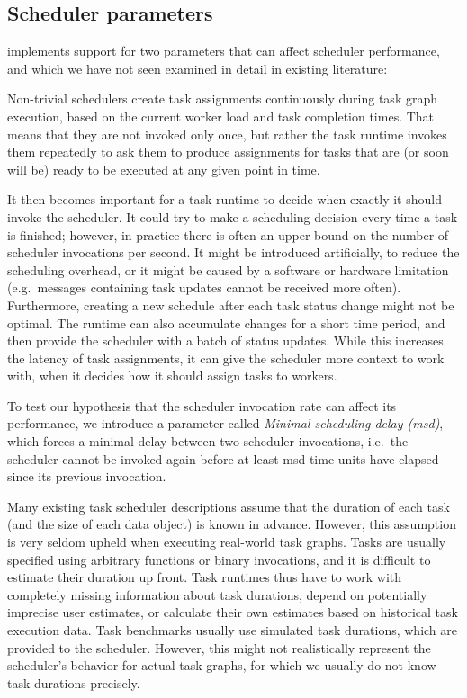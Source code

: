 \subsection{Scheduler parameters}
\estee{} implements support for two parameters that can affect scheduler
performance, and which we have not seen examined in detail in existing literature:
\begin{description}[wide=0pt]
	\item[Minimal scheduling delay] Non-trivial schedulers create task assignments continuously during task graph execution, based on
		the current worker load and task completion times. That means that they are not invoked only once,
		but rather the task runtime invokes them repeatedly to ask them to produce assignments for tasks
		that are (or soon will be) ready to be executed at any given point in time.

		It then becomes important for a task runtime to decide when exactly it should invoke the
		scheduler. It could try to make a scheduling decision every time a task is finished; however, in
		practice there is often an upper bound on the number of scheduler invocations per second. It might
		be introduced artificially, to reduce the scheduling overhead, or it might be caused by a software
		or hardware limitation (e.g.\ messages containing task updates cannot be received more often).
		Furthermore, creating a new schedule after each task status change might not be optimal. The
		runtime can also accumulate changes for a short time period, and then provide the scheduler with a
		batch of status updates. While this increases the latency of task assignments, it can give the
		scheduler more context to work with, when it decides how it should assign tasks to workers.

		To test our hypothesis that the scheduler invocation rate can affect its performance, we introduce
		a parameter called \emph{Minimal scheduling delay (\acrshort{msd})}, which forces a minimal delay between two scheduler
		invocations, i.e.\ the scheduler cannot be invoked again before at least
		\gls{msd} time units have elapsed since its previous invocation.
	\item[Information mode] Many existing task scheduler descriptions assume that the duration of each task (and the size of
		each data object) is known in advance. However, this assumption is very seldom upheld when
		executing real-world task graphs. Tasks are usually specified using arbitrary functions or binary
		invocations, and it is difficult to estimate their duration up front. Task runtimes thus have to
		work with completely missing information about task durations, depend on potentially imprecise user
		estimates, or calculate their own estimates based on historical task execution data. Task
		benchmarks usually use simulated task durations, which are provided to the scheduler. However, this
		might not realistically represent the scheduler's behavior for actual task graphs, for which we
		usually do not know task durations precisely.


\end{description}
